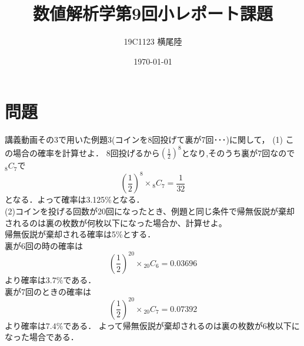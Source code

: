 \documentclass[dvipdfmx]{jsarticle}
\begin{document}
\title{数値解析学第9回小レポート課題}
\author{19C1123 横尾陸}
\date{\today}
\maketitle

\section*{問題}
講義動画その3で用いた例題3(コインを8回投げて裏が7回･･･)に関して，  
(1) この場合の確率を計算せよ．
8回投げるから$\left(\frac{1}{2}\right)^8$となり,そのうち裏が7回なので${}_8 C_7$で$$\left(\frac{1}{2}\right)^8\times{}_8 C_7=\frac{1}{32}$$となる．よって確率は3.125\%となる．\\
(2)コインを投げる回数が20回になったとき、例題と同じ条件で帰無仮説が棄却されるのは裏の枚数が何枚以下になった場合か、計算せよ。\\
帰無仮説が棄却される確率は5\%とする．\\
裏が6回の時の確率は
$$\left(\frac{1}{2}\right)^{20}\times{}_{20} C_6 = 0.03696$$
より確率は$3.7\%$である．\\
裏が7回のときの確率は
$$\left(\frac{1}{2}\right)^{20}\times{}_{20} C_7 = 0.07392$$
より確率は$7.4\%$である．
よって帰無仮説が棄却されるのは裏の枚数が6枚以下になった場合である．
\end{document}
